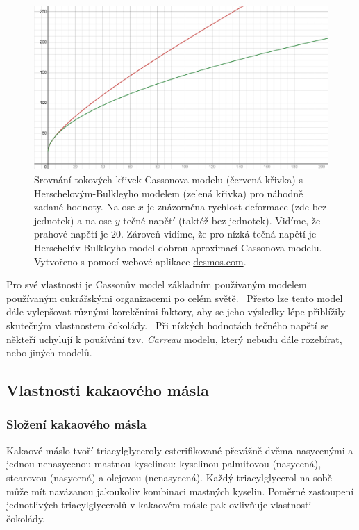 \documentclass[12pt]{article}
\begin{document}
\begin{figure}
    \centering
    \includegraphics[width=\linewidth]{figures/Casson vs Herschel.png}
    \caption{Srovnání tokových křivek Cassonova modelu (červená křivka) s Herschelovým-Bulkleyho modelem (zelená křivka) pro náhodně zadané hodnoty. Na ose $x$ je znázorněna rychlost deformace (zde bez jednotek) a na ose $y$ tečné napětí (taktéž bez jednotek). Vidíme, že prahové napětí je $20$. Zároveň vidíme, že pro nízká tečná napětí je Herschelův-Bulkleyho model dobrou aproximací Cassonova modelu. Vytvořeno s pomocí webové aplikace \url{desmos.com}.}
    \label{fig:Casson_vs_Herschel}
\end{figure}
\par\noindent
Pro své vlastnosti je Cassonův model základním používaným modelem používaným cukrářskými organizacemi po celém světě.~\cite{Article:Determination_of_chocolate_viscosity} Přesto lze tento model dále vylepšovat různými korekčními faktory, aby se jeho výsledky lépe přiblížily skutečným vlastnostem čokolády.~\cite{Article:Determination_of_chocolate_viscosity} Při nízkých hodnotách tečného napětí se někteří uchylují k používání tzv. \emph{Carreau} modelu, který nebudu dále rozebírat, nebo jiných modelů.~\cite{Article:Flow_properties_molten_chocolate}\cite{material:Tokove_chovani_reologicke_modely}

\subsection{Vlastnosti kakaového másla}
\subsubsection{Složení kakaového másla}

Kakaové máslo tvoří triacylglyceroly esterifikované převážně dvěma nasycenými a jednou nenasycenou mastnou kyselinou: kyselinou palmitovou (nasycená), stearovou (nasycená) a olejovou (nenasycená). Každý triacylglycerol na sobě může mít navázanou jakoukoliv kombinaci mastných kyselin. Poměrné zastoupení jednotlivých triacylglycerolů v kakaovém másle pak ovlivňuje vlastnosti čokolády.~\cite{Article:precrystallization}\cite{wiki:Triacylglycerol}
\end{document}
